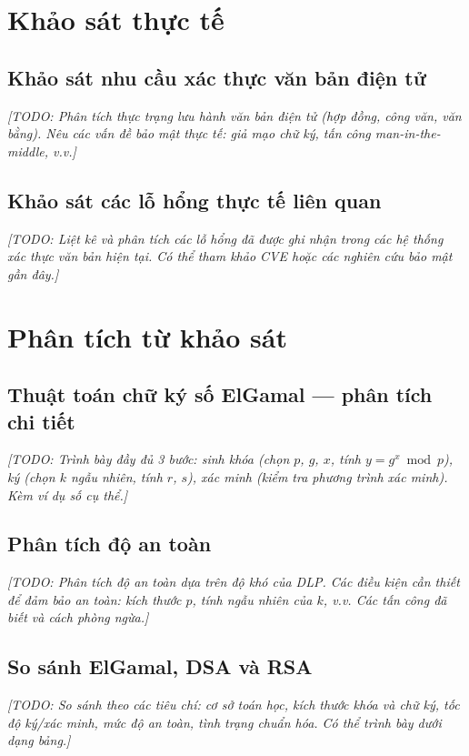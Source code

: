 \documentclass[../DoAn.tex]{subfiles}
\begin{document}
\section{Khảo sát thực tế}
\label{section:2.1}

\subsection{Khảo sát nhu cầu xác thực văn bản điện tử}
\label{section:2.1.1}
\textit{[TODO: Phân tích thực trạng lưu hành văn bản điện tử (hợp đồng, công văn, văn bằng). Nêu các vấn đề bảo mật thực tế: giả mạo chữ ký, tấn công man-in-the-middle, v.v.]}

\subsection{Khảo sát các lỗ hổng thực tế liên quan}
\label{section:2.1.2}
\textit{[TODO: Liệt kê và phân tích các lỗ hổng đã được ghi nhận trong các hệ thống xác thực văn bản hiện tại. Có thể tham khảo CVE hoặc các nghiên cứu bảo mật gần đây.]}

\section{Phân tích từ khảo sát}
\label{section:2.2}

\subsection{Thuật toán chữ ký số ElGamal --- phân tích chi tiết}
\label{section:2.2.1}
\textit{[TODO: Trình bày đầy đủ 3 bước: sinh khóa (chọn $p$, $g$, $x$, tính $y = g^x \bmod p$), ký (chọn $k$ ngẫu nhiên, tính $r$, $s$), xác minh (kiểm tra phương trình xác minh). Kèm ví dụ số cụ thể.]}

\subsection{Phân tích độ an toàn}
\label{section:2.2.2}
\textit{[TODO: Phân tích độ an toàn dựa trên độ khó của DLP. Các điều kiện cần thiết để đảm bảo an toàn: kích thước $p$, tính ngẫu nhiên của $k$, v.v. Các tấn công đã biết và cách phòng ngừa.]}

\subsection{So sánh ElGamal, DSA và RSA}
\label{section:2.2.3}
\textit{[TODO: So sánh theo các tiêu chí: cơ sở toán học, kích thước khóa và chữ ký, tốc độ ký/xác minh, mức độ an toàn, tình trạng chuẩn hóa. Có thể trình bày dưới dạng bảng.]}
\end{document}
